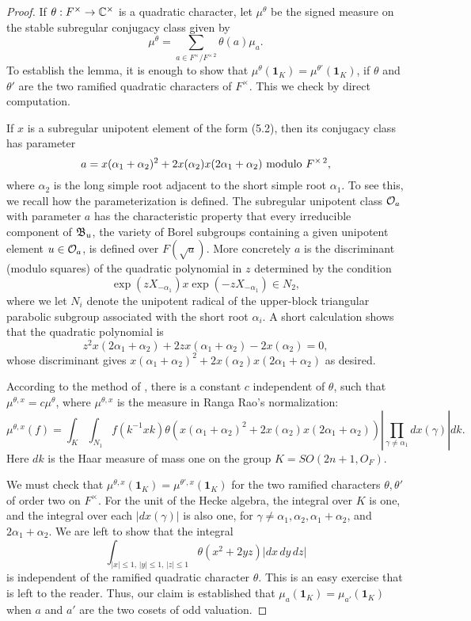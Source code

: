 \documentclass{amsart}
\begin{document}
\begin{proof}  If $\theta:F^\times\to{\Bbb C}^\times$ is a quadratic
character, let $\mu^\theta$ be the signed measure on the
stable subregular conjugacy class given by
$$\mu^\theta = \sum_{a\in F^\times/F^{\times\,2}}
  \theta(a) \mu_a.$$
To establish the lemma, it is enough to show that
$\mu^\theta({\pmb 1}_K) = \mu^{\theta'}({\pmb 1}_K)$, if
$\theta$ and $\theta'$ are the two ramified quadratic
characters of $F^\times$. This we check by direct
computation.

If $x$
is a subregular unipotent element
of the form (5.2), then its conjugacy class
has parameter $$a=x(\alpha_1+\alpha_2)^2 + 2 x(\alpha_2) x(2\alpha_1
+\alpha_2)\ \hbox{modulo}\ 
F^{\times\,2},$$ where $\alpha_2$ is the long simple root adjacent
to the short simple root $\alpha_1$. To see this, we recall how
the parameterization is defined.  The subregular unipotent class
${\mathcal O}_a$
with parameter $a$ has the characteristic property that every
irreducible component of
${\frak B}_u$, the variety of Borel subgroups containing a given unipotent element $u\in {\mathcal O}_a$,
is defined over $F(\sqrt{a})$.
More concretely $a$ is the discriminant (modulo squares) of the
quadratic polynomial in $z$ determined by the condition
$$
\exp(z X_{-\alpha_1}) x \exp(-z X_{-\alpha_1}) \in N_{2},$$
where we let $N_{i}$ denote the unipotent radical of the
upper-block triangular
parabolic subgroup associated with the short root $\alpha_i$.
A short calculation shows that the quadratic polynomial is
$$z^2 x(2\alpha_1 + \alpha_2) +2 z x(\alpha_1+\alpha_2) - 2 x(\alpha_2)=0,$$
whose discriminant gives $x(\alpha_1 +\alpha_2)^2 + 2 x(\alpha_2)
x(2\alpha_1 + \alpha_2)$ as desired.  

According to the method of \cite{H4,3.9}, there is a constant $c$ independent
of $\theta$, such that $\mu^{\theta,x} = c\mu^\theta$, where 
$\mu^{\theta,x}$ is the measure in Ranga Rao's normalization:
$$\mu^{\theta,x}(f) = \int_K\int_{N_1} f(k^{-1} x k) 
\theta(x(\alpha_1+\alpha_2)^2 + 2 x(\alpha_2) x(2\alpha_1+\alpha_2))
\left|\prod_{\gamma\ne\alpha_1} dx(\gamma)\right| dk.$$
Here $dk$ is the Haar measure of mass one on the group
$K=SO(2n+1,O_F)$.  

We must check that $\mu^{\theta,x}({\pmb 1}_K) = \mu^{\theta',x}({\pmb 1}_K)$
for the two ramified characters $\theta,\theta'$ of order two on $F^\times$.
For the unit of the Hecke algebra, the integral over $K$ is one,
and the integral over each $|dx(\gamma)|$ is also one, for
$\gamma\ne \alpha_1,\alpha_2,\alpha_1+\alpha_2$, and $2\alpha_1+\alpha_2$.
We are left to show that the integral
$$\int_{|x|\le 1,\,|y|\le 1,\,|z|\le 1} \theta(x^2 + 2 y z) |dx\,dy\,dz|$$
is independent of the ramified quadratic character $\theta$.  This is
an easy exercise that is left to the reader.
Thus, our claim is established that $\mu_a({\pmb 1}_K)=\mu_{a'}({\pmb 1}_K)$
when $a$ and $a'$ are the two cosets of odd valuation.\end{proof}
\end{document}

